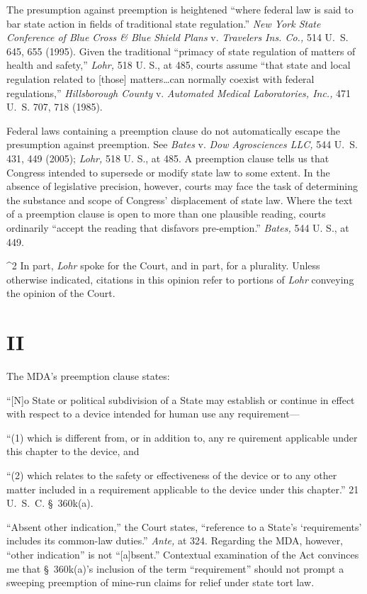   The presumption against preemption is heightened ``where federal
law is said to bar state action in fields of traditional state
regulation.'' \emph{New York State Conference of Blue Cross \& Blue Shield
Plans} v. \emph{Travelers Ins. Co.,} 514 U.~S. 645, 655 (1995). Given
the traditional ``primacy of state regulation of matters of health and
safety,'' \emph{Lohr,} 518 U. S., at 485, courts assume ``that state
and local regulation related to [those] matters\dots can normally
coexist with federal regulations,'' \emph{Hillsborough County} v.
\emph{Automated Medical Laboratories, Inc.,} 471 U.~S. 707, 718 (1985).

  Federal laws containing a preemption clause do not automatically
escape the presumption against preemption. See \emph{Bates} v. \emph{Dow
Agrosciences LLC,} 544 U.~S. 431, 449 (2005); \emph{Lohr,} 518 U. S., at
485. A preemption clause tells us that Congress intended to supersede
or modify state law to some extent. In the absence of legislative
precision, however, courts may face the task of determining the
substance \newpage  and scope of Congress' displacement of state law.
Where the text of a preemption clause is open to more than one plausible
reading, courts ordinarily ``accept the reading that disfavors
pre-emption.'' \emph{Bates,} 544 U. S., at 449.

^2 In part, \emph{Lohr} spoke for the Court, and in part, for a plurality.
Unless otherwise indicated, citations in this opinion refer to portions
of \emph{Lohr} conveying the opinion of the Court.

\section{II}

  The MDA's preemption clause states:

    ``[N]o State or political subdivision of a State may establish or
    continue in effect with respect to a device intended for human use
    any requirement---

      ``(1) which is different from, or in addition to, any re
quirement applicable under this chapter to the device, and

      ``(2) which relates to the safety or effectiveness of the device
    or to any other matter included in a requirement applicable to the
    device under this chapter.'' 21 U.~S.~C. \S~360k(a).

``Absent other indication,'' the Court states, ``reference to
a State's ‘requirements' includes its common-law duties.''
\emph{Ante,} at 324. Regarding the MDA, however, ``other indication''
is not ``[a]bsent.'' Contextual examination of the Act convinces me
that \S~360k(a)'s inclusion of the term ``requirement'' should not
prompt a sweeping preemption of mine-run claims for relief under state
tort law.\footnotemark[3]

